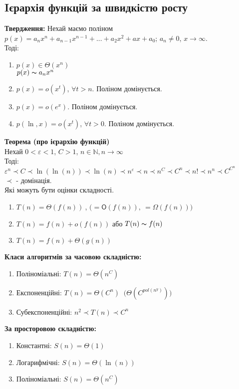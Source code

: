 \documentclass[a4paper,12pt]{article}
\begin{document}
    \subsection{Iєрархія функцій за швидкістю росту}
    \textbf{Твердження:} Нехай маємо поліном $p(x)=a_nx^n+a_{n-1}x^{n-1}+...+a_2x^2+ax+a_0$;
    $a_n\ne0$, $x\rightarrow\infty$. \\
    Тоді:
    \begin{enumerate}
        \item $p(x)\in\Theta(x^n)$ \\
        $p(x)\thicksim a_nx^n$
        \item $p(x)=o(x^t)$, $\forall t>n$. Поліном домінується.
        \item $p(x)=o(e^x)$. Поліном домінується.
        \item $p(\ln,x)=o(x^t)$, $\forall t>0$. Поліном домінується.
    \end{enumerate}
    \textbf{Теорема (про ієрархію функцій)} \\
    Нехай $0<\varepsilon<1$, $C>1$, $n\in\mathbb{N},n\rightarrow\infty$ \\
    Тоді: \\
    $\varepsilon^n\prec C\prec \ln(\ln(n))\prec\ln(n)\prec n^\varepsilon\prec n \prec n^C \prec C^n \prec n! \prec n^n\prec C^{C^n}$ \\
    $\prec$ - домінація. \\
    Які можуть бути оцінки складності.
    \begin{enumerate}
        \item $T(n)=\Theta(f(n))\:$, $\biggl(=\mathsf{O}(f(n)),\:=\Omega(f(n))\biggr)$
        \item $T(n)=f(n)+o(f(n))$ або $T(n)\thicksim f(n)$
        \item $T(n)=f(n)+\Theta(g(n))$
    \end{enumerate}
    \textbf{Класи алгоритмів за часовою складністю:}
    \begin{enumerate}
        \item Поліноміальні: $T(n)=\Theta(n^C)$
        \item Експоненційні: $T(n)=\Theta(C^n)\:$ $\biggl(\Theta(C^{pol(n^y)})\biggr)$
        \item Субекспоненційні: $n^2\prec T(n)\prec C^n$
    \end{enumerate}
    \textbf{За просторовою складністю:}
    \begin{enumerate}
        \item Константні: $S(n)=\Theta(1)$
        \item Логарифмічні: $S(n)=\Theta(\ln(n))$
        \item Поліноміальні: $S(n)=\Theta(n^C)$
    \end{enumerate}
\end{document}
